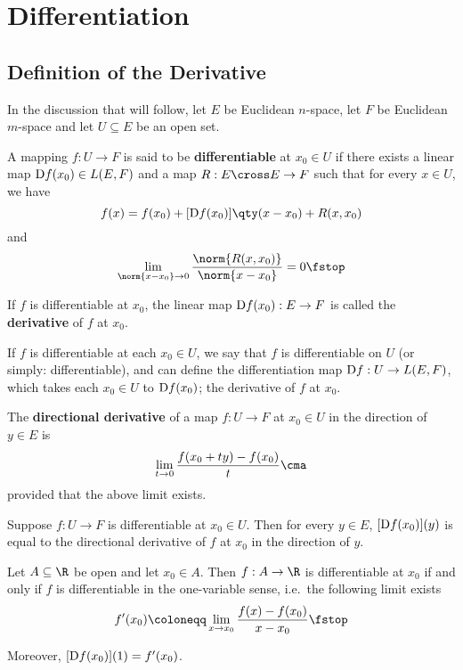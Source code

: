 \chapter{Differentiation}
\section{Definition of the Derivative}
In the discussion that will follow, let \( E \) be Euclidean \( n \)-space, let \( F \) be Euclidean \( m \)-space and let \( U\subseteq E \) be an open set.
\begin{definition}
  A mapping \( f:U\to F \) is said to be \textbf{differentiable} at \( x_0\in U \) if there exists a linear map \( \text{D} f(x_0)\in L(E,F) \) and a map \( R:E\cross E\to F \) such that for every \( x\in U \), we have
  \[ f(x)=f(x_0)+[\D f(x_0)]\qty(x-x_0)+R(x,x_0) \]
  and
  \[ \lim_{\norm{x-x_0}\to 0}\frac{\norm{R(x,x_0)}}{\norm{x-x_0}}=0\fstop \]

  If \( f \) is differentiable at \( x_0 \), the linear map \( \text{D} f(x_0):E\to F \) is called the \textbf{derivative} of \( f \) at \( x_0 \).
\end{definition}

If \( f \) is differentiable at each \( x_0\in U \), we say that \( f \) is differentiable on \( U \) (or simply: differentiable), and can define the differentiation map \( \text{D} f:U\to L(E,F) \), which takes each \( x_0\in U \) to \( \text{D} f(x_0) \); the derivative of \( f \) at \( x_0 \).

\begin{definition}
  The \textbf{directional derivative} of a map \( f:U\to F \) at \( x_0\in U \) in the direction of \( y\in E \) is
  \[ \lim_{t\to 0}\frac{f(x_0+ty)-f(x_0)}{t}\cma \]
  provided that the above limit exists.
\end{definition}

\begin{proposition}
  Suppose \( f:U\to F \) is differentiable at \( x_0\in U \). Then for every \( y\in E \), \( [\text{D} f(x_0)](y) \) is equal to the directional derivative of \( f \) at \( x_0 \) in the direction of \( y \).
\end{proposition}

\begin{corollary}
  Let \( A\subseteq\R \) be open and let \( x_0\in A \). Then \( f:A\to\R \) is differentiable at \( x_0 \) if and only if \( f \) is differentiable in the one-variable sense, i.e.\ the following limit exists
  \[ f'(x_0)\coloneqq\lim_{x\to x_0}\frac{f(x)-f(x_0)}{x-x_0}\fstop \]

  Moreover, \( [\text{D} f(x_0)](1)=f'(x_0) \).
\end{corollary}

